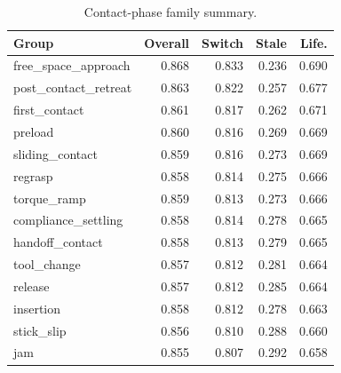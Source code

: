 \begin{table}[t]
\centering
\caption{Contact-phase family summary.}
\label{tab:phase-summary}
\small
\begin{tabular}{lrrrr}
\toprule
Group & Overall & Switch & Stale & Life. \\
\midrule
free\_space\_approach & 0.868 & 0.833 & 0.236 & 0.690 \\
post\_contact\_retreat & 0.863 & 0.822 & 0.257 & 0.677 \\
first\_contact & 0.861 & 0.817 & 0.262 & 0.671 \\
preload & 0.860 & 0.816 & 0.269 & 0.669 \\
sliding\_contact & 0.859 & 0.816 & 0.273 & 0.669 \\
regrasp & 0.858 & 0.814 & 0.275 & 0.666 \\
torque\_ramp & 0.859 & 0.813 & 0.273 & 0.666 \\
compliance\_settling & 0.858 & 0.814 & 0.278 & 0.665 \\
handoff\_contact & 0.858 & 0.813 & 0.279 & 0.665 \\
tool\_change & 0.857 & 0.812 & 0.281 & 0.664 \\
release & 0.857 & 0.812 & 0.285 & 0.664 \\
insertion & 0.858 & 0.812 & 0.278 & 0.663 \\
stick\_slip & 0.856 & 0.810 & 0.288 & 0.660 \\
jam & 0.855 & 0.807 & 0.292 & 0.658 \\
\bottomrule
\end{tabular}
\end{table}
